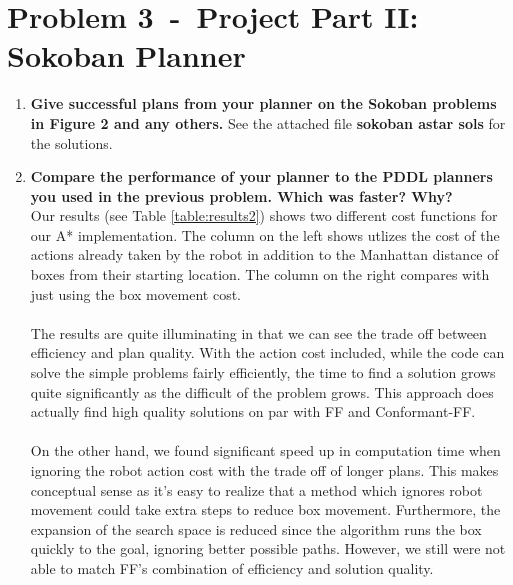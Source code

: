 \documentclass[12pt]{article}
\newcommand{\problem}[2]{\section*{Problem {#1}~-~{#2}}}
\begin{document}
\problem{3}{Project Part II: Sokoban Planner}
\label{sec:problem_3}
\begin{enumerate}
  \item \textbf{Give successful plans from your planner on the Sokoban problems in Figure 2 and any others.} 
  See the attached file \textbf{sokoban astar sols} for the solutions.
 
  \item \textbf{Compare the performance of your planner to the PDDL planners you used in the previous
problem. Which was faster? Why?} \\
Our results (see Table \ref{table:results2}) shows two different cost functions for our A* implementation. The column on the left shows utlizes the cost of the actions already taken by the robot in addition to the Manhattan distance of boxes from their starting location. The column on the right compares with just using the box movement cost. \\\\
The results are quite illuminating in that we can see the trade off between efficiency and plan quality. With the action cost included, while the code can solve the simple problems fairly efficiently, the time to find a solution grows quite significantly as the difficult of the problem grows. This approach does actually find high quality solutions on par with FF and Conformant-FF. \\\\
On the other hand, we found significant speed up in computation time when ignoring the robot action cost with the trade off of longer plans. This makes conceptual sense as it's easy to realize that a method which ignores robot movement could take extra steps to reduce box movement.  Furthermore, the expansion of the search space is reduced since the algorithm runs the box quickly to the goal, ignoring better possible paths. However, we still were not able to match FF's combination of efficiency and solution quality.


\end{enumerate}
\end{document}
